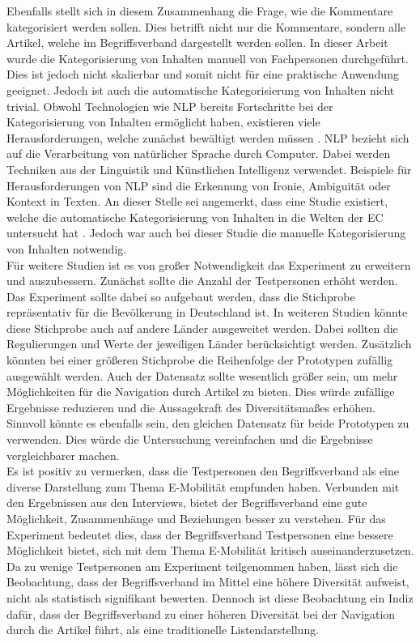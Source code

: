 Ebenfalls stellt sich in diesem Zusammenhang die Frage, wie die Kommentare kategorisiert werden sollen.
Dies betrifft nicht nur die Kommentare, sondern alle Artikel, welche im Begriffsverband dargestellt werden sollen.
In dieser Arbeit wurde die Kategorisierung von Inhalten manuell von Fachpersonen durchgeführt.
Dies ist jedoch nicht skalierbar und somit nicht für eine praktische Anwendung geeignet.
Jedoch ist auch die automatische Kategorisierung von Inhalten nicht trivial.
Obwohl Technologien wie \ac{NLP} bereits Fortschritte bei der Kategorisierung von Inhalten ermöglicht haben, existieren viele Herausforderungen, welche zunächst bewältigt werden müssen \cite{nlp}.
\ac{NLP} bezieht sich auf die Verarbeitung von natürlicher Sprache durch Computer.
Dabei werden Techniken aus der Linguistik und Künstlichen Intelligenz verwendet.
Beispiele für Herausforderungen von \ac{NLP} sind die Erkennung von Ironie, Ambiguität oder Kontext in Texten.
An dieser Stelle sei angemerkt, dass eine Studie existiert, welche die automatische Kategorisierung von Inhalten in die Welten der \ac{EC} untersucht hat \cite{solans}.
Jedoch war auch bei dieser Studie die manuelle Kategorisierung von Inhalten notwendig. \\

Für weitere Studien ist es von großer Notwendigkeit das Experiment zu erweitern und auszubessern.
Zunächst sollte die Anzahl der Testpersonen erhöht werden.
Das Experiment sollte dabei so aufgebaut werden, dass die Stichprobe repräsentativ für die Bevölkerung in Deutschland ist.
In weiteren Studien könnte diese Stichprobe auch auf andere Länder ausgeweitet werden.
Dabei sollten die Regulierungen und Werte der jeweiligen Länder berücksichtigt werden.
Zusätzlich könnten bei einer größeren Stichprobe die Reihenfolge der Prototypen zufällig ausgewählt werden.
Auch der Datensatz sollte wesentlich größer sein, um mehr Möglichkeiten für die Navigation durch Artikel zu bieten.
Dies würde zufällige Ergebnisse reduzieren und die Aussagekraft des Diversitätsmaßes erhöhen.
Sinnvoll könnte es ebenfalls sein, den gleichen Datensatz für beide Prototypen zu verwenden.
Dies würde die Untersuchung vereinfachen und die Ergebnisse vergleichbarer machen.\\

Es ist positiv zu vermerken, dass die Testpersonen den Begriffsverband als eine diverse Darstellung zum Thema E-Mobilität empfunden haben.
Verbunden mit den Ergebnissen aus den Interviews, bietet der Begriffsverband eine gute Möglichkeit, Zusammenhänge und Beziehungen besser zu verstehen.
Für das Experiment bedeutet dies, dass der Begriffsverband Testpersonen eine bessere Möglichkeit bietet, sich mit dem Thema E-Mobilität kritisch auseinanderzusetzen.
Da zu wenige Testpersonen am Experiment teilgenommen haben, lässt sich die Beobachtung, dass der Begriffsverband im Mittel eine höhere Diversität aufweist, nicht als statistisch signifikant bewerten.
Dennoch ist diese Beobachtung ein Indiz dafür, dass der Begriffsverband zu einer höheren Diversität bei der Navigation durch die Artikel führt, als eine traditionelle Listendarstellung. \\

